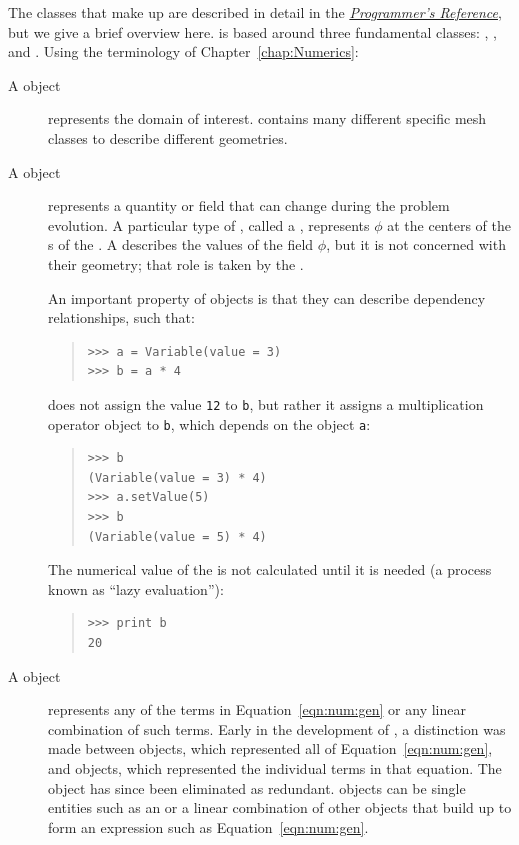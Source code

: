 The \Python{} classes that make up \FiPy{} are described in detail in
the \href{file:reference.pdf}{\textit{\FiPy{} Programmer's
Reference}}, but we give a brief overview here.  \FiPy{} is based
around three fundamental \Python{} classes: ,
, and .  Using the terminology of
Chapter~\ref{chap:Numerics}:
\begin{description}
    \item[A  object] represents the domain of interest.
    \FiPy{} contains many different specific mesh classes to describe
    different geometries.

    \item[A  object] represents a quantity or field
    that can change during the problem evolution.  A particular type
    of , called a , represents \(
    \phi \) at the centers of the s of the .
    A  describes the values of the field \( \phi
    \), but it is not concerned with their geometry; that role is
    taken by the .

    An important property of  objects is that they can
    describe dependency relationships, such that:    
\begin{quote}
\begin{verbatim}
>>> a = Variable(value = 3)
>>> b = a * 4
\end{verbatim}
\end{quote}
    does not assign the value \verb|12| to \verb|b|, but rather it
    assigns a multiplication operator object to \verb|b|, which
    depends on the  object \verb|a|:
\begin{quote}
\begin{verbatim}
>>> b
(Variable(value = 3) * 4)
>>> a.setValue(5)
>>> b
(Variable(value = 5) * 4)
\end{verbatim}
\end{quote}
    The numerical value of the  is not calculated
    until it is needed (a process known as ``lazy evaluation''):
\begin{quote}
\begin{verbatim}
>>> print b
20
\end{verbatim}
\end{quote}

    \item[A  object] represents any of the terms in
    Equation~\eqref{eqn:num:gen} or any linear combination of such
    terms.  Early in the development of \FiPy{}, a distinction was
    made between  objects, which represented all of
    Equation~\eqref{eqn:num:gen}, and  objects, which
    represented the individual terms in that equation.  The
     object has since been eliminated as redundant.
     objects can be single entities such as an
     or a linear combination of other
     objects that build up to form an expression such as
    Equation~\eqref{eqn:num:gen}.
    
\end{description}

